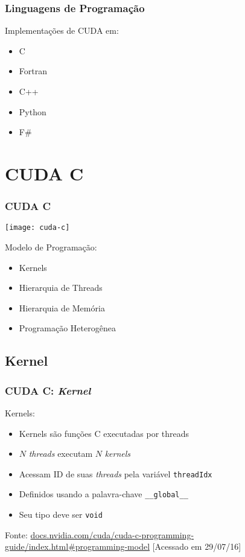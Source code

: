 \documentclass[10pt, compress, aspectratio=43, xcolor={table,usenames,dvipsnames}]{beamer}
\begin{document}
\begin{frame}
    \frametitle{Linguagens de Programação}
    Implementações de CUDA em:
    \begin{itemize}
        \item \alert{C}
        \item Fortran
        \item C++
        \item Python
        \item F\#
    \end{itemize}
\end{frame}

\section{CUDA C}

\begin{frame}
    \frametitle{CUDA C}
    \begin{center}
        \texttt{[image: cuda-c]}
    \end{center}

    Modelo de Programação:
    \begin{itemize}
        \item \alert{Kernels}
        \item Hierarquia de \alert{Threads}
        \item Hierarquia de \alert{Memória}
        \item Programação \alert{Heterogênea}
    \end{itemize}
\end{frame}

\subsection{Kernel}

\begin{frame}
    \frametitle{CUDA C: \textit{Kernel}}
    \alert{Kernels}:
    \begin{itemize}
        \item \alert{Kernels} são funções C executadas por \alert{threads}
        \item $N$ \textit{threads} executam $N$ \textit{kernels}
        \item Acessam \alert{ID} de suas \textit{threads} pela variável \alert{\texttt{threadIdx}}
        \item Definidos usando a palavra-chave \alert{\texttt{\_\_global\_\_}}
        \item Seu tipo deve ser \alert{\texttt{void}}
    \end{itemize}

    \vfill

    \begin{center}
        \tiny{Fonte: \url{docs.nvidia.com/cuda/cuda-c-programming-guide/index.html\#programming-model} [Acessado em 29/07/16]}
    \end{center}
\end{frame}
\end{document}
